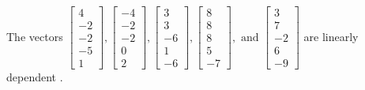 \begin{exercise}
\begin{exerciseStatement}
  \end{exerciseStatement}
  \begin{exerciseAnswer}
   The vectors \(\left[\begin{array}{r}
4 \\
-2 \\
-2 \\
-5 \\
1
\end{array}\right] , \left[\begin{array}{r}
-4 \\
-2 \\
-2 \\
0 \\
2
\end{array}\right] , \left[\begin{array}{r}
3 \\
3 \\
-6 \\
1 \\
-6
\end{array}\right] , \left[\begin{array}{r}
8 \\
8 \\
8 \\
5 \\
-7
\end{array}\right] , \text{ and } \left[\begin{array}{r}
3 \\
7 \\
-2 \\
6 \\
-9
\end{array}\right]\) are 
  	 linearly dependent  .
  


  \end{exerciseAnswer}
\end{exercise}